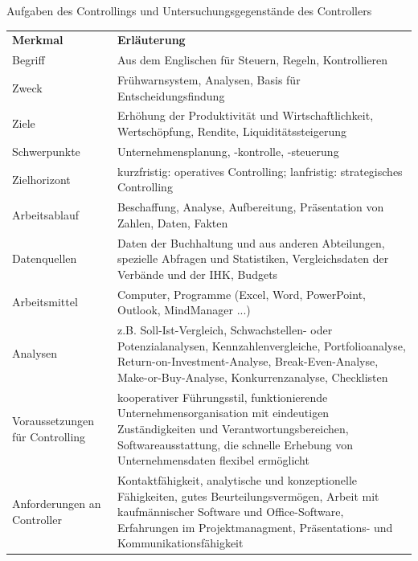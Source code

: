 Aufgaben des Controllings und Untersuchungsgegenstände des Controllers\\
\begin{tabular}{	p{}
				p{}}
	{\bf Merkmal} & {\bf Erläuterung}\\
	Begriff & Aus dem Englischen für \ql Steuern, Regeln, Kontrollieren\qr\\
	Zweck & Frühwarnsystem, Analysen, Basis für Entscheidungsfindung\\
	Ziele & Erhöhung der Produktivität und Wirtschaftlichkeit, Wertschöpfung, Rendite, Liquiditätssteigerung\\
	Schwerpunkte & Unternehmensplanung, -kontrolle, -steuerung\\
	Zielhorizont & kurzfristig: operatives Controlling; lanfristig: strategisches Controlling\\
	Arbeitsablauf & Beschaffung, Analyse, Aufbereitung, Präsentation von Zahlen, Daten, Fakten\\
	Datenquellen & Daten der Buchhaltung und aus anderen Abteilungen, spezielle Abfragen und Statistiken, Vergleichsdaten der Verbände und der IHK, Budgets\\
	Arbeitsmittel & Computer, Programme (Excel, Word, PowerPoint, Outlook, MindManager ...)\\
	Analysen & z.B. Soll-Ist-Vergleich, Schwachstellen- oder Potenzialanalysen, Kennzahlenvergleiche, Portfolioanalyse, Return-on-Investment-Analyse, Break-Even-Analyse, Make-or-Buy-Analyse, Konkurrenzanalyse, Checklisten\\
	Voraussetzungen für Controlling & kooperativer Führungsstil, funktionierende Unternehmensorganisation mit eindeutigen Zuständigkeiten und Verantwortungsbereichen, Softwareausstattung, die schnelle Erhebung von Unternehmensdaten flexibel ermöglicht\\
	Anforderungen an Controller & Kontaktfähigkeit, analytische und konzeptionelle Fähigkeiten, gutes Beurteilungsvermögen, Arbeit mit kaufmännischer Software und Office-Software, Erfahrungen im Projektmanagment, Präsentations- und Kommunikationsfähigkeit\\
\end{tabular}\newline

